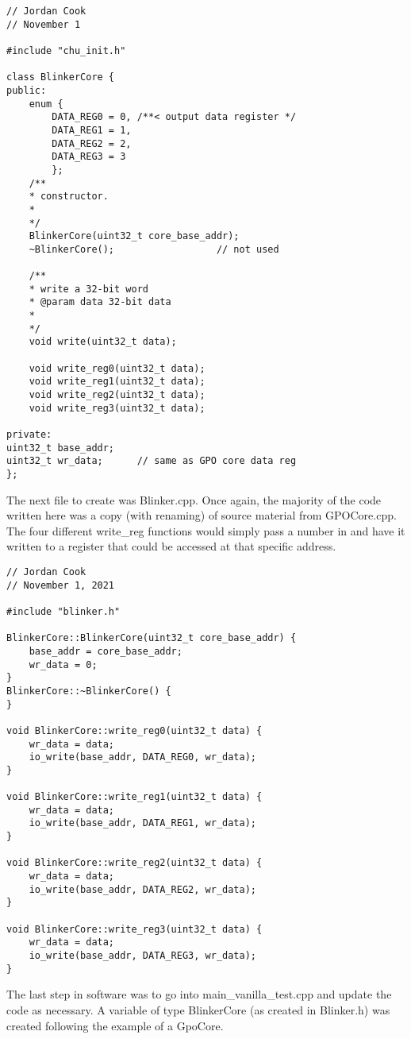 \documentclass[11pt]{article}
\begin{document}
\begin{lstlisting}[style=CStyle, caption = Blinker.h]
// Jordan Cook
// November 1

#include "chu_init.h"

class BlinkerCore {
public:
	enum {
		DATA_REG0 = 0, /**< output data register */
		DATA_REG1 = 1,
		DATA_REG2 = 2,
		DATA_REG3 = 3
		};
	/**
	* constructor.
	*
	*/
	BlinkerCore(uint32_t core_base_addr);
	~BlinkerCore();                  // not used
	
	/**
	* write a 32-bit word
	* @param data 32-bit data
	*
	*/
	void write(uint32_t data);
	
	void write_reg0(uint32_t data);
	void write_reg1(uint32_t data);
	void write_reg2(uint32_t data);
	void write_reg3(uint32_t data);

private:
uint32_t base_addr;
uint32_t wr_data;      // same as GPO core data reg
};
\end{lstlisting}

\quad The next file to create was Blinker.cpp. Once again, the majority of the code written here was a copy (with renaming) of source material from GPOCore.cpp. The four different write\_reg functions would simply pass a number in and have it written to a register that could be accessed at that specific address. 

\begin{lstlisting}[style=CStyle, caption = Blinker.cpp]
// Jordan Cook
// November 1, 2021

#include "blinker.h"

BlinkerCore::BlinkerCore(uint32_t core_base_addr) {
	base_addr = core_base_addr;
	wr_data = 0;
}
BlinkerCore::~BlinkerCore() {
}

void BlinkerCore::write_reg0(uint32_t data) {
	wr_data = data;
	io_write(base_addr, DATA_REG0, wr_data);
}

void BlinkerCore::write_reg1(uint32_t data) {
	wr_data = data;
	io_write(base_addr, DATA_REG1, wr_data);
}

void BlinkerCore::write_reg2(uint32_t data) {
	wr_data = data;
	io_write(base_addr, DATA_REG2, wr_data);
}

void BlinkerCore::write_reg3(uint32_t data) {
	wr_data = data;
	io_write(base_addr, DATA_REG3, wr_data);
}
\end{lstlisting}

\quad The last step in software was to go into main\_vanilla\_test.cpp and update the code as necessary. A variable of type BlinkerCore (as created in Blinker.h) was created following the example of a GpoCore. 
\end{document}
